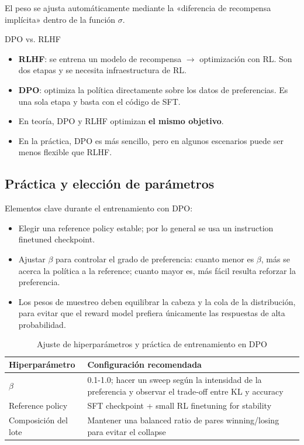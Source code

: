 El peso se ajusta automáticamente mediante la «diferencia de recompensa implícita» dentro de la función $\sigma$.

\begin{knowledgebox}{DPO vs. RLHF}
\begin{itemize}
    \item \textbf{RLHF}: se entrena un modelo de recompensa $\to$ optimización con RL. Son dos etapas y se necesita infraestructura de RL.
    \item \textbf{DPO}: optimiza la política directamente sobre los datos de preferencias. Es una sola etapa y basta con el código de SFT.
    \item En teoría, DPO y RLHF optimizan \textbf{el mismo objetivo}.
    \item En la práctica, DPO es más sencillo, pero en algunos escenarios puede ser menos flexible que RLHF.
\end{itemize}
\end{knowledgebox}

\subsection{Práctica y elección de parámetros}

Elementos clave durante el entrenamiento con DPO:
\begin{itemize}
    \item Elegir una reference policy estable; por lo general se usa un instruction finetuned checkpoint.
    \item Ajustar $\beta$ para controlar el grado de preferencia: cuanto menor es $\beta$, más se acerca la política a la reference; cuanto mayor es, más fácil resulta reforzar la preferencia.
    \item Los pesos de muestreo deben equilibrar la cabeza y la cola de la distribución, para evitar que el reward model prefiera únicamente las respuestas de alta probabilidad.
\end{itemize}

\begin{table}[H]
\centering
\begin{tabular}{p{} p{}}
\toprule
Hiperparámetro & Configuración recomendada \\
\midrule
$\beta$ & 0.1-1.0; hacer un sweep según la intensidad de la preferencia y observar el trade-off entre KL y accuracy \\
Reference policy & SFT checkpoint + small RL finetuning for stability \\
Composición del lote & Mantener una balanced ratio de pares winning/losing para evitar el collapse \\
\bottomrule
\end{tabular}
\caption{Ajuste de hiperparámetros y práctica de entrenamiento en DPO}
\end{table}

